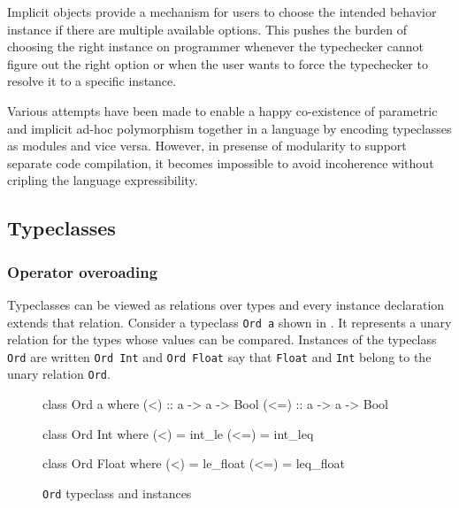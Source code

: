 \documentclass[manuscript,screen,nonacm]{acmart}
\begin{document}
Implicit objects\cite{oliveira_typeclasses_2010} provide a mechanism for users to choose the intended behavior instance if there are multiple available options. This pushes the burden of choosing the right instance on programmer whenever the typechecker cannot figure out the right option or when the user wants to force the typechecker to resolve it to a specific instance.

Various attempts\cite{dreyer_modular_2007, wehr_ml_2008, white_modular_2014} have been made to enable a happy co-existence of parametric and implicit ad-hoc polymorphism together in a language by encoding typeclasses as modules and vice versa. However, in presense of modularity to support separate code compilation, it becomes impossible to avoid incoherence without cripling the language expressibility.

\subsection{Typeclasses}
\subsubsection{Operator overoading}
Typeclasses can be viewed as relations over types and every instance declaration extends that relation. Consider a typeclass \lstinline{Ord a} shown in . It represents a unary relation for the types whose values can be compared. Instances of the typeclass \lstinline{Ord} are written \lstinline{Ord Int} and \lstinline{Ord Float} say that \lstinline{Float} and \lstinline{Int} belong to the unary relation \lstinline{Ord}.


\begin{figure}[ht]
  \centering
  \begin{minipage}[ht]{0.3\linewidth}
    \begin{code}
      class Ord a where
         (<)  :: a -> a -> Bool
         (<=) :: a -> a -> Bool
    \end{code}
  \end{minipage}%
  \begin{minipage}[ht]{0.3\linewidth}
    \begin{code}
      class Ord Int where
         (<)  = int_le
         (<=) = int_leq
    \end{code}
  \end{minipage}%
  \begin{minipage}[ht]{0.3\linewidth}
    \begin{code}
      class Ord Float where
         (<)  = le_float
         (<=) = leq_float
    \end{code}
  \end{minipage}
  \caption{\lstinline{Ord} typeclass and instances}
  \label{fig:tc-ord}
\end{figure}
\end{document}
